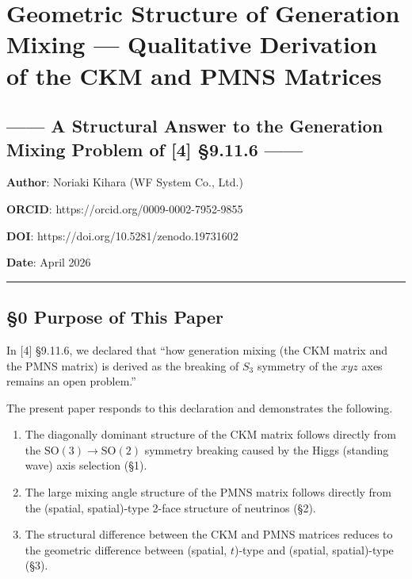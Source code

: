 \documentclass[
  a4paper,11pt]{article}
\author{}
\date{}
\providecommand{\tightlist}{%
  \setlength{\itemsep}{0pt}\setlength{\parskip}{0pt}}
\begin{document}
\section{Geometric Structure of Generation Mixing --- Qualitative
Derivation of the CKM and PMNS
Matrices}\label{geometric-structure-of-generation-mixing-qualitative-derivation-of-the-ckm-and-pmns-matrices}

\subsection{------ A Structural Answer to the Generation Mixing Problem
of {[}4{]} §9.11.6
------}\label{a-structural-answer-to-the-generation-mixing-problem-of-4-9.11.6}

\textbf{Author}: Noriaki Kihara (WF System Co., Ltd.)

\textbf{ORCID}: https://orcid.org/0009-0002-7952-9855

\textbf{DOI}: https://doi.org/10.5281/zenodo.19731602

\textbf{Date}: April 2026

\begin{center}\rule{0.5\linewidth}{0.5pt}\end{center}

\subsection{§0 Purpose of This Paper}\label{purpose-of-this-paper}

In {[}4{]} §9.11.6, we declared that ``how generation mixing (the CKM
matrix and the PMNS matrix) is derived as the breaking of \(S_3\)
symmetry of the \(xyz\) axes remains an open problem.''

The present paper responds to this declaration and demonstrates the
following.

\begin{enumerate}
\def\labelenumi{\arabic{enumi}.}
\tightlist
\item
  The diagonally dominant structure of the CKM matrix follows directly
  from the \(\mathrm{SO}(3) \to \mathrm{SO}(2)\) symmetry breaking
  caused by the Higgs (standing wave) axis selection (§1).
\item
  The large mixing angle structure of the PMNS matrix follows directly
  from the (spatial, spatial)-type 2-face structure of neutrinos (§2).
\item
  The structural difference between the CKM and PMNS matrices reduces to
  the geometric difference between (spatial, \(t\))-type and (spatial,
  spatial)-type (§3).
\end{enumerate}
\end{document}
